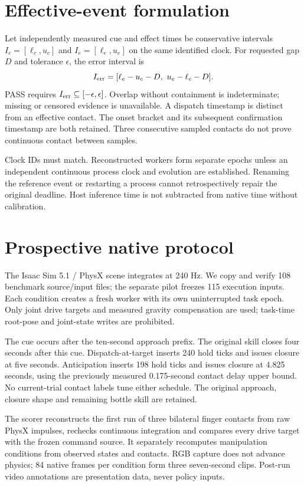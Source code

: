 \documentclass{article}
\begin{document}
\section{Effective-event formulation}
Let independently measured cue and effect times be conservative intervals
$I_c=[\ell_c,u_c]$ and $I_e=[\ell_e,u_e]$ on the same identified clock.
For requested gap $D$ and tolerance $\epsilon$, the error interval is
\[ I_{\rm err}=[\ell_e-u_c-D,\ u_e-\ell_c-D]. \]
PASS requires $I_{\rm err}\subseteq[-\epsilon,\epsilon]$.
Overlap without containment is indeterminate; missing or censored evidence
is unavailable. A dispatch timestamp is distinct from an effective contact.
The onset bracket and its subsequent confirmation timestamp are both retained.
Three consecutive sampled contacts do not prove continuous contact between samples.

Clock IDs must match. Reconstructed workers form separate epochs unless an
independent continuous process clock and evolution are established. Renaming
the reference event or restarting a process cannot retrospectively repair the
original deadline. Host inference time is not subtracted from native time
without calibration.

\section{Prospective native protocol}
The Isaac Sim 5.1 / PhysX scene integrates at 240 Hz. We copy and verify 108
benchmark source/input files; the separate pilot freezes 115 execution inputs.
Each condition creates a fresh worker with its own uninterrupted task epoch.
Only joint drive targets and measured gravity compensation are used; task-time
root-pose and joint-state writes are prohibited.

The cue occurs after the ten-second approach prefix. The original skill closes
four seconds after this cue. Dispatch-at-target inserts 240 hold ticks and
issues closure at five seconds. Anticipation inserts 198 hold ticks and issues
closure at 4.825 seconds, using the previously measured 0.175-second contact
delay upper bound. No current-trial contact labels tune either schedule.
The original approach, closure shape and remaining bottle skill are retained.

The scorer reconstructs the first run of three bilateral finger contacts from
raw PhysX impulses, rechecks continuous integration and compares every drive
target with the frozen command source. It separately recomputes manipulation
conditions from observed states and contacts. RGB capture does not advance
physics; 84 native frames per condition form three seven-second clips.
Post-run video annotations are presentation data, never policy inputs.
\end{document}

